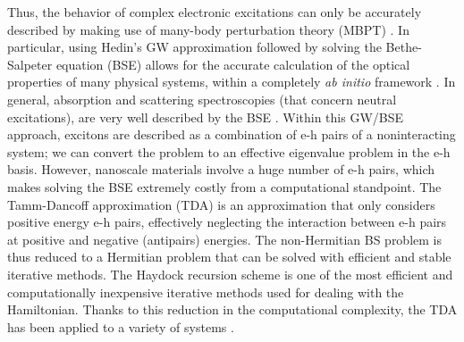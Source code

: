 \documentclass[aps,prb,10pt,showpacs,superscriptaddress,twocolumn,notitlepage]{revtex4-1}
\begin{document}
Thus, the behavior of complex electronic excitations can only be accurately
described by making use of many-body perturbation theory (MBPT)
\cite{fetterbook72}. In particular, using Hedin's GW approximation
\cite{hedinPR65} followed by solving the Bethe-Salpeter equation (BSE)
\cite{salpeterPR51, abrikosovbook65, shamPR66, hankePRB80, onidaRMP02} allows
for the accurate calculation of the optical properties of many physical systems,
within a completely \emph{ab initio} framework \cite{shirleyPRL93,
albrechtPRB97, benedictPRL98, benedictPRB99, benedictPRB03, palummoJPCM04,
sittPRA07, ramosPRB08, roccaJCP10, garciaJCP11, gruningCMS11, gattiPRB13}.
In general, absorption and scattering spectroscopies (that concern neutral
excitations), are very well described by the BSE \cite{onidaPRL95, albrechtPRL98,
benedictPRB98, rohlfingPRL98b, onidaRMP02}. Within this GW/BSE approach,
excitons are described as a combination of e-h pairs of a noninteracting system;
we can convert the problem to an effective eigenvalue problem in the e-h basis.
However, nanoscale materials involve a huge number of e-h pairs, which makes
solving the BSE extremely costly from a computational standpoint. The
Tamm-Dancoff approximation (TDA) \cite{fetterbook72} is an approximation that
only considers positive energy e-h pairs, effectively neglecting the interaction
between e-h pairs at positive and negative (antipairs) energies. The
non-Hermitian BS problem is thus reduced to a Hermitian problem that can be
solved with efficient and stable iterative methods. The Haydock recursion scheme
\cite{haydockJPC72, haydockCPC80, roccaJCP08} is one of the most efficient and
computationally inexpensive iterative methods used for dealing with the
Hamiltonian. Thanks to this reduction in the computational complexity, the TDA
has been applied to a variety of systems \cite{lopezPRL06, arnaudPRL06,
wirtzPRL06}.
\end{document}
